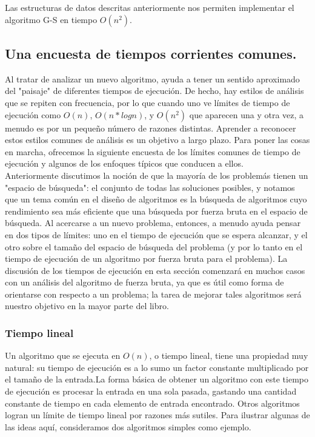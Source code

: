 \documentclass[a4paper]{article}
\begin{document}
Las estructuras de datos descritas anteriormente nos permiten implementar el algoritmo G-S en tiempo $O(n^2)$.\\

\subsection{Una encuesta de tiempos corrientes comunes.}

Al tratar de analizar un nuevo algoritmo, ayuda a tener un sentido aproximado del "paisaje" de diferentes tiempos de ejecución. De hecho, hay estilos de análisis que se repiten con frecuencia, por lo que cuando uno ve límites de tiempo de ejecución como $O(n)$, $O(n*log n)$, y $O(n^2)$ que aparecen una y otra vez, a menudo es por un pequeño número de razones distintas. Aprender a reconocer estos estilos comunes de análisis es un objetivo a largo plazo. Para poner las cosas en marcha, ofrecemos la siguiente encuesta de los límites comunes de tiempo de ejecución y algunos de los enfoques típicos que conducen a ellos.\\

Anteriormente discutimos la noción de que la mayoría de los problemás tienen un "espacio de búsqueda": el conjunto de todas las soluciones posibles, y notamos que un tema común en el diseño de algoritmos es la búsqueda de algoritmos cuyo rendimiento sea más eficiente que una búsqueda por fuerza bruta en el espacio de búsqueda. Al acercarse a un nuevo problema, entonces, a menudo ayuda pensar en dos tipos de límites: uno en el tiempo de ejecución que se espera alcanzar, y el otro sobre el tamaño del espacio de búsqueda del problema (y por lo tanto en el tiempo de ejecución de un algoritmo por fuerza bruta para el problema). La discusión de los tiempos de ejecución en esta sección comenzará en muchos casos con un análisis del algoritmo de fuerza bruta, ya que es útil como forma de orientarse con respecto a un problema; la tarea de mejorar tales algoritmos será nuestro objetivo en la mayor parte del libro.\\

\subsubsection*{Tiempo lineal} 

Un algoritmo que se ejecuta en $O(n)$, o tiempo lineal, tiene una propiedad muy natural: su tiempo de ejecución es a lo sumo un factor constante multiplicado por el tamaño de la entrada.La forma básica de obtener un algoritmo con este tiempo de ejecución es procesar la entrada en una sola pasada, gastando una cantidad constante de tiempo en cada elemento de entrada encontrado. Otros algoritmos logran un límite de tiempo lineal por razones más sutiles. Para ilustrar algunas de las ideas aquí, consideramos dos algoritmos simples como ejemplo.\\
\end{document}
